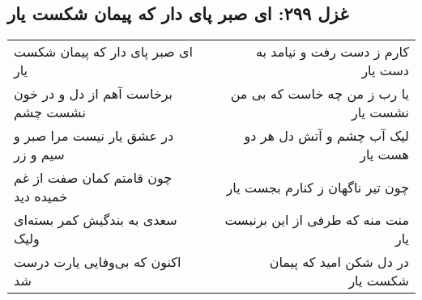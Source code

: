 \begin{center}
\section*{غزل ۲۹۹: ای صبر پای دار که پیمان شکست یار}
\label{sec:299}
\begin{longtable}{l p{0.5cm} r}
ای صبر پای دار که پیمان شکست یار
&&
کارم ز دست رفت و نیامد به دست یار
\\
برخاست آهم از دل و در خون نشست چشم
&&
یا رب ز من چه خاست که بی من نشست یار
\\
در عشق یار نیست مرا صبر و سیم و زر
&&
لیک آب چشم و آتش دل هر دو هست یار
\\
چون قامتم کمان صفت از غم خمیده دید
&&
چون تیر ناگهان ز کنارم بجست یار
\\
سعدی به بندگیش کمر بسته‌ای ولیک
&&
منت منه که طرفی از این برنبست یار
\\
اکنون که بی‌وفایی یارت درست شد
&&
در دل شکن امید که پیمان شکست یار
\\
\end{longtable}
\end{center}
